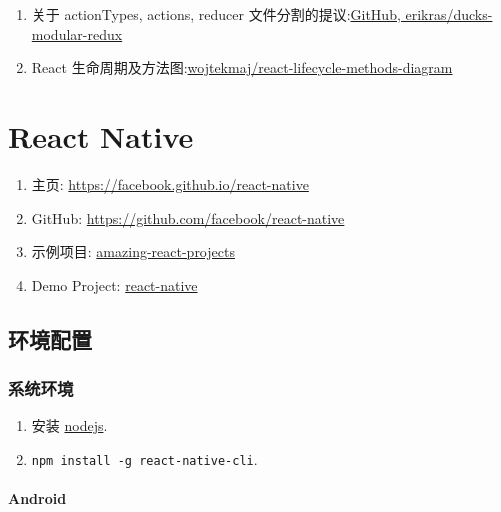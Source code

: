 \begin{enumerate}
\def\labelenumi{\arabic{enumi}.}
\tightlist
\item
  关于 actionTypes, actions, reducer
  文件分割的提议:\href{https://github.com/erikras/ducks-modular-redux}{GitHub,
  erikras/ducks-modular-redux}
\item
  React
  生命周期及方法图:\href{https://github.com/wojtekmaj/react-lifecycle-methods-diagram}{wojtekmaj/react-lifecycle-methods-diagram}
\end{enumerate}

\section{React Native}\label{react-native}

\begin{enumerate}
\def\labelenumi{\arabic{enumi}.}
\tightlist
\item
  主页: \url{https://facebook.github.io/react-native}
\item
  GitHub: \url{https://github.com/facebook/react-native}
\item
  示例项目:
  \href{https://github.com/jiwonbest/amazing-react-projects}{amazing-react-projects}
\item
  Demo Project:
  \href{https://github.com/HereChen/template/tree/master/react-native}{react-native}
\end{enumerate}

\subsection{环境配置}\label{ux73afux5883ux914dux7f6e}

\subsubsection{系统环境}\label{ux7cfbux7edfux73afux5883}

\begin{enumerate}
\def\labelenumi{\arabic{enumi}.}
\tightlist
\item
  安装 \href{https://nodejs.org}{nodejs}.
\item
  \lstinline!npm install -g react-native-cli!.
\end{enumerate}

\paragraph{Android}\label{android}


